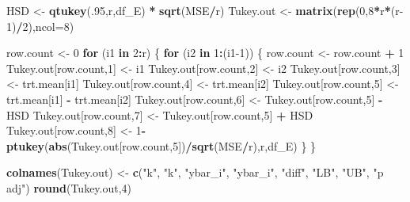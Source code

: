 \documentclass[
]{book}
\newenvironment{Shaded}{\begin{snugshade}}{\end{snugshade}}
\newcommand{\AttributeTok}[1]{\textcolor[rgb]{0.13,0.29,0.53}{#1}}
\newcommand{\ControlFlowTok}[1]{\textcolor[rgb]{0.13,0.29,0.53}{\textbf{#1}}}
\newcommand{\DecValTok}[1]{\textcolor[rgb]{0.00,0.00,0.81}{#1}}
\newcommand{\FunctionTok}[1]{\textcolor[rgb]{0.13,0.29,0.53}{\textbf{#1}}}
\newcommand{\NormalTok}[1]{#1}
\newcommand{\OtherTok}[1]{\textcolor[rgb]{0.56,0.35,0.01}{#1}}
\newcommand{\SpecialCharTok}[1]{\textcolor[rgb]{0.81,0.36,0.00}{\textbf{#1}}}
\newcommand{\StringTok}[1]{\textcolor[rgb]{0.31,0.60,0.02}{#1}}
\begin{document}
\begin{Shaded}
\begin{Highlighting}[]
\NormalTok{HSD }\OtherTok{\textless{}{-}} \FunctionTok{qtukey}\NormalTok{(.}\DecValTok{95}\NormalTok{,r,df\_E) }\SpecialCharTok{*} \FunctionTok{sqrt}\NormalTok{(MSE}\SpecialCharTok{/}\NormalTok{r)}
\NormalTok{Tukey.out }\OtherTok{\textless{}{-}} \FunctionTok{matrix}\NormalTok{(}\FunctionTok{rep}\NormalTok{(}\DecValTok{0}\NormalTok{,}\DecValTok{8}\SpecialCharTok{*}\NormalTok{r}\SpecialCharTok{*}\NormalTok{(r}\DecValTok{{-}1}\NormalTok{)}\SpecialCharTok{/}\DecValTok{2}\NormalTok{),}\AttributeTok{ncol=}\DecValTok{8}\NormalTok{)}

\NormalTok{row.count }\OtherTok{\textless{}{-}} \DecValTok{0}
\ControlFlowTok{for}\NormalTok{ (i1 }\ControlFlowTok{in} \DecValTok{2}\SpecialCharTok{:}\NormalTok{r) \{}
  \ControlFlowTok{for}\NormalTok{ (i2 }\ControlFlowTok{in} \DecValTok{1}\SpecialCharTok{:}\NormalTok{(i1}\DecValTok{{-}1}\NormalTok{)) \{}
\NormalTok{    row.count }\OtherTok{\textless{}{-}}\NormalTok{ row.count }\SpecialCharTok{+} \DecValTok{1}
\NormalTok{    Tukey.out[row.count,}\DecValTok{1}\NormalTok{] }\OtherTok{\textless{}{-}}\NormalTok{ i1}
\NormalTok{    Tukey.out[row.count,}\DecValTok{2}\NormalTok{] }\OtherTok{\textless{}{-}}\NormalTok{ i2}
\NormalTok{    Tukey.out[row.count,}\DecValTok{3}\NormalTok{] }\OtherTok{\textless{}{-}}\NormalTok{ trt.mean[i1]}
\NormalTok{    Tukey.out[row.count,}\DecValTok{4}\NormalTok{] }\OtherTok{\textless{}{-}}\NormalTok{ trt.mean[i2]}
\NormalTok{    Tukey.out[row.count,}\DecValTok{5}\NormalTok{] }\OtherTok{\textless{}{-}}\NormalTok{ trt.mean[i1] }\SpecialCharTok{{-}}\NormalTok{ trt.mean[i2]}
\NormalTok{    Tukey.out[row.count,}\DecValTok{6}\NormalTok{] }\OtherTok{\textless{}{-}}\NormalTok{ Tukey.out[row.count,}\DecValTok{5}\NormalTok{] }\SpecialCharTok{{-}}\NormalTok{ HSD}
\NormalTok{    Tukey.out[row.count,}\DecValTok{7}\NormalTok{] }\OtherTok{\textless{}{-}}\NormalTok{ Tukey.out[row.count,}\DecValTok{5}\NormalTok{] }\SpecialCharTok{+}\NormalTok{ HSD}
\NormalTok{    Tukey.out[row.count,}\DecValTok{8}\NormalTok{] }\OtherTok{\textless{}{-}} 
      \DecValTok{1}\SpecialCharTok{{-}}\FunctionTok{ptukey}\NormalTok{(}\FunctionTok{abs}\NormalTok{(Tukey.out[row.count,}\DecValTok{5}\NormalTok{])}\SpecialCharTok{/}\FunctionTok{sqrt}\NormalTok{(MSE}\SpecialCharTok{/}\NormalTok{r),r,df\_E)}
\NormalTok{  \}}
\NormalTok{\}}

\FunctionTok{colnames}\NormalTok{(Tukey.out) }\OtherTok{\textless{}{-}} \FunctionTok{c}\NormalTok{(}\StringTok{"k"}\NormalTok{, }\StringTok{"k\textquotesingle{}"}\NormalTok{, }\StringTok{"ybar\_i"}\NormalTok{, }\StringTok{"ybar\_i\textquotesingle{}"}\NormalTok{, }\StringTok{"diff"}\NormalTok{,}
                         \StringTok{"LB"}\NormalTok{, }\StringTok{"UB"}\NormalTok{, }\StringTok{"p adj"}\NormalTok{)}
\FunctionTok{round}\NormalTok{(Tukey.out,}\DecValTok{4}\NormalTok{)}
\end{Highlighting}
\end{Shaded}
\end{document}
